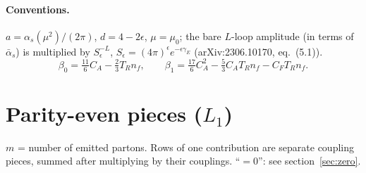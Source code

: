 \documentclass[11pt,a4paper]{article}
\newcommand{\ep}{\epsilon}
\begin{document}
\paragraph{Conventions.} $a=\alpha_s(\mu^2)/(2\pi)$, $d=4-2\ep$, $\mu=\mu_0$; the bare $L$-loop amplitude (in terms of
$\bar\alpha_s$) is multiplied by $S_\ep^{-L}$, $S_\ep=(4\pi)^\ep e^{-\ep\gamma_E}$ (arXiv:2306.10170, eq.~(5.1)).
\[
\beta_0=\tfrac{11}{6}C_A-\tfrac23T_Rn_f,\qquad \beta_1=\tfrac{17}{6}C_A^2-\tfrac53C_AT_Rn_f-C_FT_Rn_f .
\]

\section{Parity-even pieces (\texorpdfstring{$L_1$}{L1})}

$m$ = number of emitted partons. Rows of one contribution are separate coupling pieces, summed after multiplying by
their couplings. ``$=0$'': see section~\ref{sec:zero}.
\end{document}
